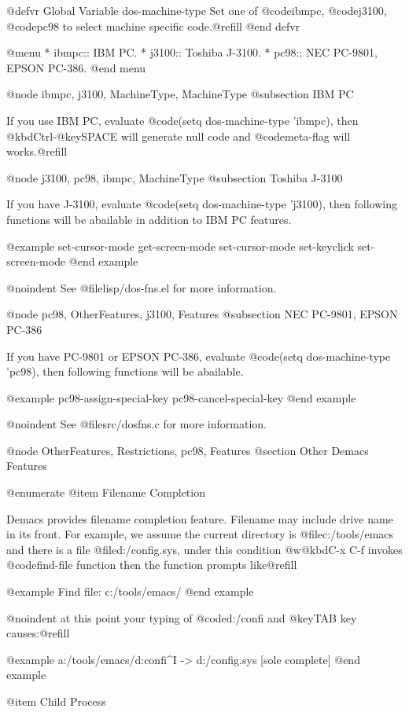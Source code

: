 @defvr {Global Variable} dos-machine-type
Set one of @code{ibmpc}, @code{j3100}, @code{pc98} to select machine
specific code.@refill
@end defvr

@menu
* ibmpc::  IBM PC.
* j3100::  Toshiba J-3100.
* pc98::   NEC PC-9801, EPSON PC-386.
@end menu


@node ibmpc, j3100, MachineType, MachineType
@subsection IBM PC

If you use IBM PC, evaluate @code{(setq dos-machine-type 'ibmpc)}, then
@kbd{Ctrl-@key{SPACE}} will generate null code and @code{meta-flag} will
works.@refill


@node j3100, pc98, ibmpc, MachineType
@subsection Toshiba J-3100

If you have J-3100, evaluate @code{(setq dos-machine-type 'j3100)}, then 
following functions will be abailable in addition to IBM PC features.

@example
set-cursor-mode
get-screen-mode
set-cursor-mode
set-keyclick
set-screen-mode
@end example

@noindent
See @file{lisp/dos-fns.el} for more information.


@node pc98, OtherFeatures, j3100, Features
@subsection NEC PC-9801, EPSON PC-386

If you have PC-9801 or EPSON PC-386, evaluate @code{(setq
dos-machine-type 'pc98)}, then following functions will be abailable.

@example
pc98-assign-special-key
pc98-cancel-special-key
@end example

@noindent
See @file{src/dosfns.c} for more information.


@node OtherFeatures, Restrictions, pc98, Features
@section Other Demacs Features

@enumerate
@item
Filename Completion

Demacs provides filename completion feature. Filename may include drive
name in its front. For example, we assume the current directory is
@file{c:/tools/emacs} and there is a file @file{d:/config.sys}, under
this condition @w{@kbd{C-x C-f}} invokes @code{find-file} function then
the function prompts like@refill

@example
Find file: c:/tools/emacs/
@end example

@noindent
at this point your typing of @code{d:/confi} and @key{TAB} key causes:@refill

@example
a:/tools/emacs/d:confi^I  -> d:/config.sys [sole complete]
@end example

@item 
Child Process

